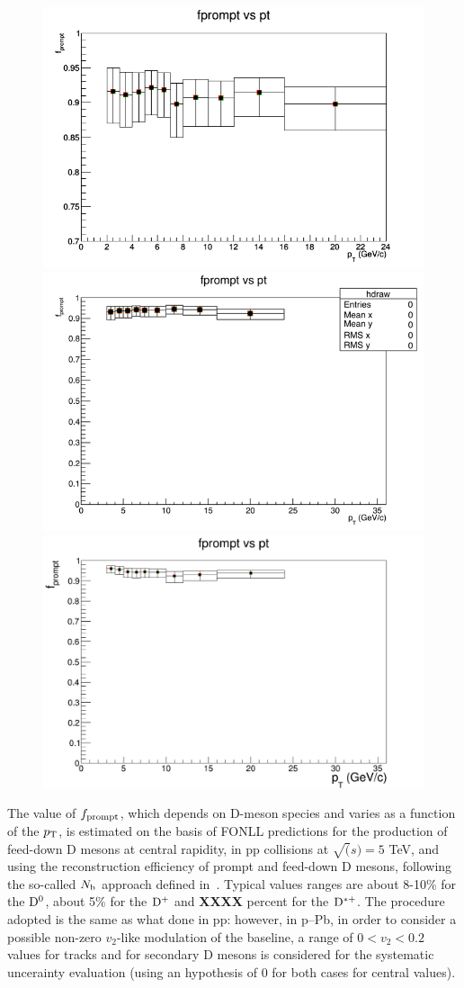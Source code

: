 \begin{figure}
\includegraphics[width=.49\linewidth]{figures/Effs/fprompt_D0.png}
\includegraphics[width=.49\linewidth]{figures/Effs/fprompt_Dstar.png}
\includegraphics[width=.49\linewidth]{figures/Effs/fpromptDplus.png}
\end{figure}


The value of $f_{\rm prompt}$, which depends on D-meson species and varies as a function of the $p_{\rm T}$, is estimated on the basis of FONLL predictions for the production of feed-down D mesons at central rapidity, in pp collisions at $\sqrt(s) = 5$ TeV, and using the reconstruction efficiency of prompt and feed-down D mesons, following the so-called $N_{\rm b}$ approach defined in~\cite{ALICEDmespp7Tev}. Typical values ranges are about 8-10\% for the
${\rm D^0}$, about 5\% for the ${\rm D^+}$ and {\bf XXXX} percent for the ${\rm D^{*+}}$. The procedure adopted is the same as what done in pp: however, in p--Pb, in order to consider a possible non-zero $v_{2}$-like modulation of the baseline, a range of $0<v_{2}<0.2$ values for tracks and for secondary D mesons is considered for the systematic uncerainty evaluation (using an hypothesis of 0 for both cases for central values).

